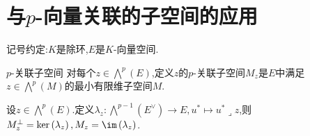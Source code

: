 \section{与\texorpdfstring{$p$}{p}-向量关联的子空间的应用}

记号约定:$K$是除环,$E$是$K$-向量空间.

\begin{definition}{$p$-关联子空间}{}
	对每个$z\in\bigwedge\limits^{p}\left(E\right)$,定义$z$的$p$-关联子空间$M_{z}$是$E$中满足$z\in\bigwedge\limits^{p}\left(M\right)$的最小有限维子空间$M$.
\end{definition}

\begin{proposition}{}{}
	设$z\in\bigwedge\limits^{p}\left(E\right)$.定义$\lambda_{z}:\bigwedge\limits^{p-1}\left(E^{\vee}\right)\to E,u^{\ast}\mapsto u^{\ast}\lrcorner z$,则$M_{z}^{\perp}=\ker\left(\lambda_{z}\right),M_{z}=\im\left(\lambda_{z}\right)$.
\end{proposition}




